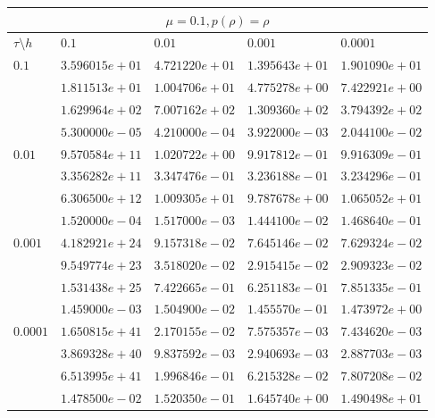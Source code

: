 \documentclass[12pt,a4paper]{article}
\begin{document}
\begin{tabular}{ |l|l|l|l|l| }
    \hline
    \multicolumn{5}{|c|}{$\mu = 0.1, p(\rho)  = \rho$}\\
    \hline
    $\tau\setminus h$ & $0.1$ & $0.01$ & $0.001$ & $0.0001$\\
    \hline
    $0.1$ & $3.596015e+01$ & $4.721220e+01$ & $1.395643e+01$ & $1.901090e+01$ \\
    & $1.811513e+01$ & $1.004706e+01$ & $4.775278e+00$ & $7.422921e+00$ \\
    & $1.629964e+02$ & $7.007162e+02$ & $1.309360e+02$ & $3.794392e+02$ \\
    & $5.300000e-05$ & $4.210000e-04$ & $3.922000e-03$ & $2.044100e-02$ \\
    \hline
    $0.01$ & $9.570584e+11$ & $1.020722e+00$ & $9.917812e-01$ & $9.916309e-01$ \\
    & $3.356282e+11$ & $3.347476e-01$ & $3.236188e-01$ & $3.234296e-01$ \\
    & $6.306500e+12$ & $1.009305e+01$ & $9.787678e+00$ & $1.065052e+01$ \\
    & $1.520000e-04$ & $1.517000e-03$ & $1.444100e-02$ & $1.468640e-01$ \\
    \hline
    $0.001$ & $4.182921e+24$ & $9.157318e-02$ & $7.645146e-02$ & $7.629324e-02$ \\
    & $9.549774e+23$ & $3.518020e-02$ & $2.915415e-02$ & $2.909323e-02$ \\
    & $1.531438e+25$ & $7.422665e-01$ & $6.251183e-01$ & $7.851335e-01$ \\
    & $1.459000e-03$ & $1.504900e-02$ & $1.455570e-01$ & $1.473972e+00$ \\
    \hline
    $0.0001$ & $1.650815e+41$ & $2.170155e-02$ & $7.575357e-03$ & $7.434620e-03$ \\
    & $3.869328e+40$ & $9.837592e-03$ & $2.940693e-03$ & $2.887703e-03$ \\
    & $6.513995e+41$ & $1.996846e-01$ & $6.215328e-02$ & $7.807208e-02$ \\
    & $1.478500e-02$ & $1.520350e-01$ & $1.645740e+00$ & $1.490498e+01$ \\
    \hline
\end{tabular}
\end{document}
